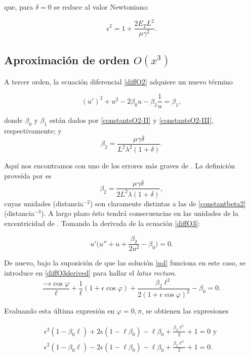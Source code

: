 \documentclass{article}
\begin{document}
que, para $\delta=0$ se reduce al valor Newtoniano:

\begin{equation}
	\epsilon^2=1+\frac{2E_TL^2}{\mu\gamma^2}.
\end{equation}

\subsection{Aproximación de orden $O(x^3)$}

A tercer orden, la ecuación diferencial \eqref{diffO2} adquiere un nuevo término

\begin{equation}\label{diffO3}
	(u')^2+u^2-2\beta_0 u-\beta_2\frac{1}{u}=\beta_1,
\end{equation}

donde $\beta_0$ y $\beta_1$ están dados por \eqref{constantsO2-II} y \eqref{constantsO2-III}, respectivamente; y
\begin{equation}\label{constantbeta2}
	\beta_2=\frac{\mu\gamma\delta}{L^2\lambda^2(1+\delta)}.
\end{equation}

Aquí nos encontramos con uno de los errores más graves de \cite{Capozziello}. La definición proveída por \cite{Capozziello} es $$\beta_2=\frac{\mu \gamma \delta}{2 L^{2} \lambda(1+\delta)},$$ cuyas unidades (distancia$^{-2}$) son claramente distintas a las de \eqref{constantbeta2} (distancia$^{-3}$). A largo plazo ésto tendrá consecuencias en las unidades de la excentricidad de \cite{Capozziello}. Tomando la derivada de la ecuación \eqref{diffO3}:

\begin{equation}\label{diffO3derived}
	u'\Big(u''+u+\frac{\beta_2}{2u^2}-\beta_0\Big)=0.
\end{equation}

De nuevo, bajo la suposición de que las solución \eqref{sol} funciona en este caso, se introduce en \eqref{diffO3derived} para hallar el \textit{latus rectum}.
$$\frac{-\epsilon\cos\varphi}{\ell}+\frac{1}{\ell}(1+\epsilon\cos\varphi)+\frac{\beta_2\ell^2}{2(1+\epsilon\cos\varphi)^2}-\beta_0=0.$$

Evaluando esta última expresión en $\varphi=0, \pi$, se obtienen las expresiones

\begin{gather}
	\epsilon^2(1-\beta_0\ell)+2\epsilon(1-\ell\beta_0)-\ell\beta_0+\frac{\beta_2\ell^3}{2}+1=0 \text{ y }\label{sum1}\\
	\epsilon^2(1-\beta_0\ell)-2\epsilon(1-\ell\beta_0)-\ell\beta_0+\frac{\beta_2\ell^3}{2}+1=0\label{sum2}.
\end{gather}
\end{document}
